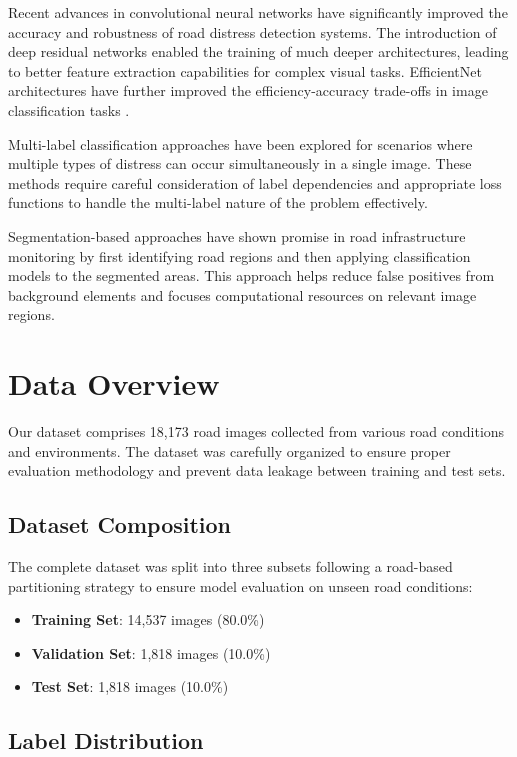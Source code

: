 \documentclass[12pt,twocolumn]{article}
\begin{document}
Recent advances in convolutional neural networks have significantly improved the accuracy and robustness of road distress detection systems. The introduction of deep residual networks \citet{he2016deep} enabled the training of much deeper architectures, leading to better feature extraction capabilities for complex visual tasks. EfficientNet architectures have further improved the efficiency-accuracy trade-offs in image classification tasks \citet{krizhevsky2012imagenet}.

Multi-label classification approaches have been explored for scenarios where multiple types of distress can occur simultaneously in a single image. These methods require careful consideration of label dependencies and appropriate loss functions to handle the multi-label nature of the problem effectively.

Segmentation-based approaches have shown promise in road infrastructure monitoring by first identifying road regions and then applying classification models to the segmented areas. This approach helps reduce false positives from background elements and focuses computational resources on relevant image regions.

\section{Data Overview}

Our dataset comprises 18,173 road images collected from various road conditions and environments. The dataset was carefully organized to ensure proper evaluation methodology and prevent data leakage between training and test sets.

\subsection{Dataset Composition}

The complete dataset was split into three subsets following a road-based partitioning strategy to ensure model evaluation on unseen road conditions:

\begin{itemize}
\item \textbf{Training Set}: 14,537 images (80.0\%)
\item \textbf{Validation Set}: 1,818 images (10.0\%)
\item \textbf{Test Set}: 1,818 images (10.0\%)
\end{itemize}

\subsection{Label Distribution}
\end{document}
